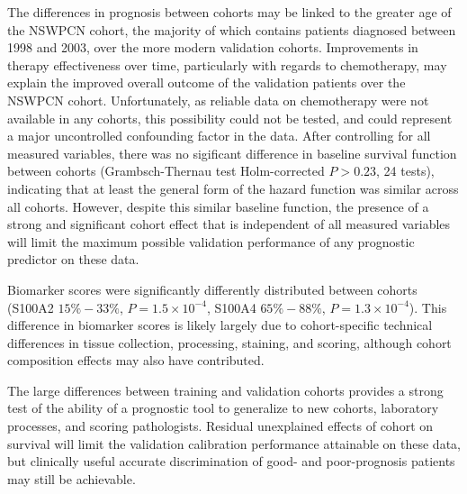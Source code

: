 \documentclass[dissertation.tex]{subfiles}
\begin{document}
The differences in prognosis between cohorts may be linked to the greater age of the \gls{NSWPCN} cohort, the majority of which contains patients diagnosed between 1998 and 2003, over the more modern validation cohorts.  Improvements in therapy effectiveness over time, particularly with regards to chemotherapy, may  explain the improved overall outcome of the validation patients over the \gls{NSWPCN} cohort.  Unfortunately, as reliable data on chemotherapy were not available in any cohorts, this possibility could not be tested, and could represent a major uncontrolled confounding factor in the data.  After controlling for all measured variables, there was no sigificant difference in baseline survival function between cohorts (Grambsch-Thernau test \cite{Grambsch1994} Holm-corrected $P > 0.23$, 24 tests), indicating that at least the general form of the hazard function was similar across all cohorts.  However, despite this similar baseline function, the presence of a strong and significant cohort effect that is independent of all measured variables will limit the maximum possible validation performance of any prognostic predictor on these data.

Biomarker scores were significantly differently distributed between cohorts (S100A2 $15\%-33\%$, $P = 1.5 \times 10^{-4}$, S100A4 $65\%-88\%$, $P = 1.3 \times 10^{-4}$).  This difference in biomarker scores is likely largely due to cohort-specific technical differences in tissue collection, processing, staining, and scoring, although cohort composition effects may also have contributed.

The large differences between training and validation cohorts provides a strong test of the ability of a prognostic tool to generalize to new cohorts, laboratory processes, and scoring pathologists.  Residual unexplained effects of cohort on survival will limit the validation calibration performance attainable on these data, but clinically useful accurate discrimination of good- and poor-prognosis patients may still be achievable.
\end{document}
